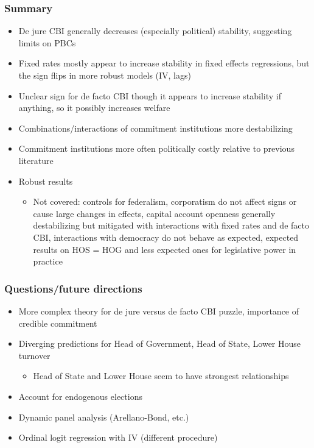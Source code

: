 \documentclass{beamer}
\begin{document}
    \begin{frame}
        \frametitle{Summary}
        \begin{itemize}
            \item De jure CBI generally decreases (especially political) stability, suggesting limits on PBCs
            \item Fixed rates mostly appear to increase stability in fixed effects regressions, but the sign flips in more robust models (IV, lags)
            \item Unclear sign for de facto CBI though it appears to increase stability if anything, so it possibly increases welfare
            \item Combinations/interactions of commitment institutions more destabilizing
            \item Commitment institutions more often politically costly relative to previous literature
            \item Robust results
            \begin{itemize}
                \item Not covered: controls for federalism, corporatism do not affect signs or cause large changes in effects, capital account openness generally destabilizing but mitigated with interactions with fixed rates and de facto CBI, interactions with democracy do not behave as expected, expected results on HOS = HOG and less expected ones for legislative power in practice
            \end{itemize}
        \end{itemize}
    \end{frame}

    \begin{frame}
        \frametitle{Questions/future directions}
        \begin{itemize}
            \item More complex theory for de jure versus de facto CBI puzzle, importance of credible commitment
            \item Diverging predictions for Head of Government, Head of State, Lower House turnover
            \begin{itemize}
                \item Head of State and Lower House seem to have strongest relationships
            \end{itemize}
            \item Account for endogenous elections
            \item Dynamic panel analysis (Arellano-Bond, etc.)
            \item Ordinal logit regression with IV (different procedure)
        \end{itemize}
    \end{frame}
\end{document}
